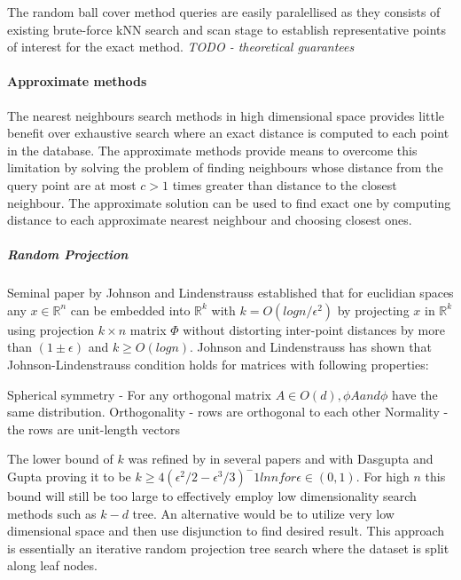 The random ball cover method queries are easily paralellised as they consists
of existing brute-force kNN search and scan stage to establish representative
points of interest for the exact method\cite{Cayton6267877}. 
\textit{TODO - theoretical guarantees}

\paragraph*{Approximate methods}

The nearest neighbours search methods in high dimensional space provides little
benefit over exhaustive search where an exact distance is computed to each point
in the
database\cite{Weber:1998:QAP:645924.671192}\cite{Andoni:2008:NHA:1327452.1327494}.
The approximate methods provide means to overcome this limitation by solving the
problem of finding neighbours whose distance from the query point are at most $
c > 1 $ times greater than distance to the closest neighbour. The approximate
solution can be used to find exact one by computing distance to each approximate
nearest neighbour and choosing closest ones.

\subparagraph*{Random Projection}

Seminal paper by Johnson and Lindenstrauss\cite{johnson84extensionslipschitz}
established that for euclidian spaces any $ x \in \mathbb{R}^n $ can be embedded
into $ \mathbb{R}^k $ with $ k = O(log n/\epsilon^2)$ by projecting $ x $
in $ \mathbb{R}^k $ using projection $ k \times n $ matrix $ \Phi $  without
distorting inter-point distances by more than $ (1\pm\epsilon) $ and $ k \geq
O(log n)$.  Johnson and Lindenstrauss\cite{johnson84extensionslipschitz} has
shown that Johnson-Lindenstrauss condition holds for matrices with following
properties:
\begin{blockquote}
  Spherical symmetry - For any orthogonal matrix $ A \in O(d), \phi A and \phi $ have the same distribution.
  Orthogonality - rows are orthogonal to each other
  Normality - the rows are unit-length vectors
\end{blockquote}\cite{ailon2009fast}

The lower bound of $ k $ was refined by in
several papers\cite{frankl1988johnson}\cite{Dasgupta:2003:EPT:639790.639795}\cite{Indyk:1998:ANN:276698.276876}\cite{Achlioptas:2003:DRP:861182.861189} and with Dasgupta and Gupta\cite{Dasgupta:2003:EPT:639790.639795} proving it to be $ k \geq 4 (\epsilon^2/2 - \epsilon^3/3)^-1 ln n for \epsilon \in (0,1) $.
For high $ n $ this bound will still be too large to effectively employ low
dimensionality search methods such as $ k-d $ tree. An alternative would be to
utilize very low dimensional space and then use disjunction to find desired
result. This approach is essentially an iterative random projection tree search
where the dataset is split along leaf nodes.

